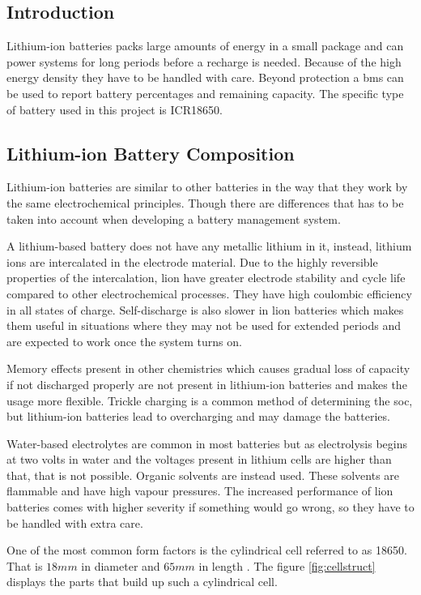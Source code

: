 
\subsection{Introduction}
Lithium-ion batteries packs large amounts of energy in a small package and can power systems for long periods before a recharge is needed. Because of the high energy density they have to be handled with care. Beyond protection a \gls{bms} can be used to report battery percentages and remaining capacity. The specific type of battery used in this project is ICR18650.


\subsection{Lithium-ion Battery Composition}
Lithium-ion batteries are similar to other batteries in the way that they work by the same electrochemical principles. Though there are differences that has to be taken into account when developing a battery management system.

A lithium-based battery does not have any metallic lithium in it, instead, lithium ions are intercalated in the electrode material. Due to the highly reversible properties of the intercalation, \gls{lion} have greater electrode stability and cycle life compared to other electrochemical processes. They have high coulombic efficiency in all states of charge. Self-discharge is also slower in \gls{lion} batteries which makes them useful in situations where they may not be used for extended periods and are expected to work once the system turns on.

Memory effects present in other chemistries which causes gradual loss of capacity if not discharged properly are not present in lithium-ion batteries and makes the usage more flexible. Trickle charging is a common method of determining the \gls{soc}, but lithium-ion batteries lead to overcharging and may damage the batteries.

Water-based electrolytes are common in most batteries but as electrolysis begins at two volts in water and the voltages present in lithium cells are higher than that, that is not possible. Organic solvents are instead used. These solvents are flammable and have high vapour pressures. The increased performance of \gls{lion} batteries comes with higher severity if something would go wrong, so they have to be handled with extra care.

One of the most common form factors is the cylindrical cell referred to as 18650. That is $18mm$ in diameter and $65mm$ in length \cite[p. 26-27]{book}. The figure \autoref{fig:cellstruct} displays the parts that build up such a cylindrical cell.

